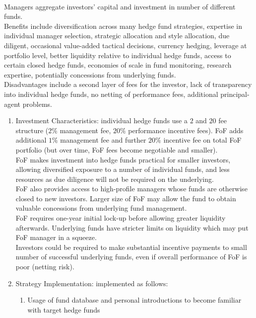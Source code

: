 \begin{remark} \\
Managers aggregate investors' capital and investment in number of different funds.\\
Benefits include diversification across many hedge fund strategies, expertise in individual manager selection, strategic allocation and style allocation, due diligent, occasional value-added tactical decisions, currency hedging, leverage at portfolio level, better liquidity relative to individual hedge funds, access to certain closed hedge funds, economies of scale in fund monitoring, research expertise, potentially concessions from underlying funds.\\
Disadvantages include a second layer of fees for the investor, lack of transparency into individual hedge funds, no netting of performance fees, additional principal-agent problems.
\begin{enumerate}[label=\roman*.]
\setlength{\itemsep}{0pt}
\item Investment Characteristics: individual hedge funds use a $2$ and $20$ fee structure ($2\%$ management fee, $20\%$ performance incentive fees). FoF adds additional $1\%$ management fee and further $20\%$ incentive fee on total FoF portfolio (but over time, FoF fees become negotiable and smaller).\\
FoF makes investment into hedge funds practical for smaller investors, allowing diversified exposure to a number of individual funds, and less resources as due diligence will not be required on the underlying.\\
FoF also provides access to high-profile managers whose funds are otherwise closed to new investors. Larger size of FoF may allow the fund to obtain valuable concessions from underlying fund management.\\
FoF requires one-year initial lock-up before allowing greater liquidity afterwards. Underlying funds have stricter limits on liquidity which may put FoF manager in a squeeze.\\
Investors could be required to make substantial incentive payments to small number of successful underlying funds, even if overall performance of FoF is poor (netting risk).
\item Strategy Implementation: implemented as follows:
\begin{enumerate}[label=\arabic*.]
\setlength{\itemsep}{0pt}
\item Usage of fund database and personal introductions to become familiar with target hedge funds

\end{enumerate}
\end{enumerate}
\end{remark}
